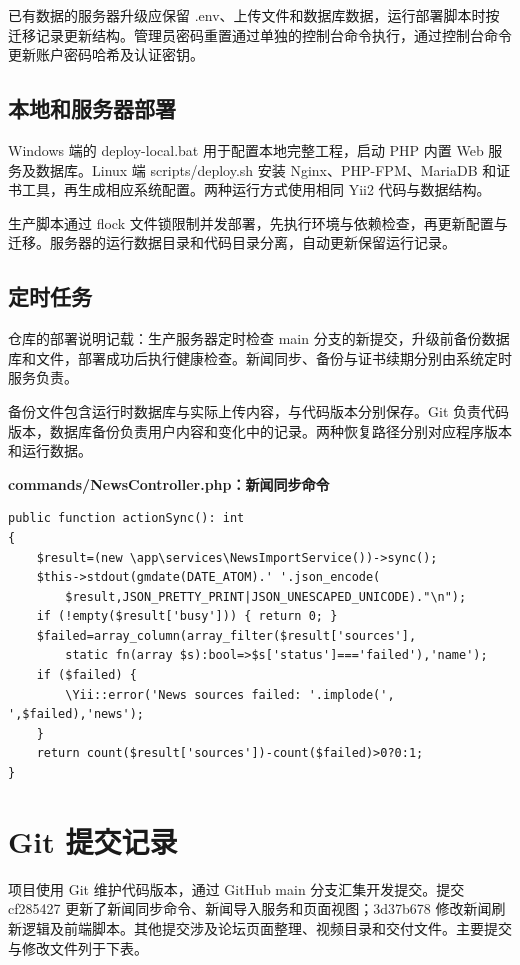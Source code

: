 \documentclass[UTF8,a4paper,11pt]{ctexart}
\begin{document}
已有数据的服务器升级应保留 .env、上传文件和数据库数据，运行部署脚本时按迁移记录更新结构。管理员密码重置通过单独的控制台命令执行，通过控制台命令更新账户密码哈希及认证密钥。

\subsection{本地和服务器部署}
Windows 端的 deploy-local.bat 用于配置本地完整工程，启动 PHP 内置 Web 服务及数据库。Linux 端 scripts/deploy.sh 安装 Nginx、PHP-FPM、MariaDB 和证书工具，再生成相应系统配置。两种运行方式使用相同 Yii2 代码与数据结构。

生产脚本通过 flock 文件锁限制并发部署，先执行环境与依赖检查，再更新配置与迁移。服务器的运行数据目录和代码目录分离，自动更新保留运行记录。

\subsection{定时任务}
仓库的部署说明记载：生产服务器定时检查 main 分支的新提交，升级前备份数据库和文件，部署成功后执行健康检查。新闻同步、备份与证书续期分别由系统定时服务负责。

备份文件包含运行时数据库与实际上传内容，与代码版本分别保存。Git 负责代码版本，数据库备份负责用户内容和变化中的记录。两种恢复路径分别对应程序版本和运行数据。


\noindent\textbf{commands/NewsController.php：新闻同步命令}\par\vspace{2pt}
\begin{lstlisting}
public function actionSync(): int
{
    $result=(new \app\services\NewsImportService())->sync();
    $this->stdout(gmdate(DATE_ATOM).' '.json_encode(
        $result,JSON_PRETTY_PRINT|JSON_UNESCAPED_UNICODE)."\n");
    if (!empty($result['busy'])) { return 0; }
    $failed=array_column(array_filter($result['sources'],
        static fn(array $s):bool=>$s['status']==='failed'),'name');
    if ($failed) {
        \Yii::error('News sources failed: '.implode(', ',$failed),'news');
    }
    return count($result['sources'])-count($failed)>0?0:1;
}
\end{lstlisting}

\section{Git 提交记录}
项目使用 Git 维护代码版本，通过 GitHub main 分支汇集开发提交。提交 cf285427 更新了新闻同步命令、新闻导入服务和页面视图；3d37b678 修改新闻刷新逻辑及前端脚本。其他提交涉及论坛页面整理、视频目录和交付文件。主要提交与修改文件列于下表。
\end{document}
